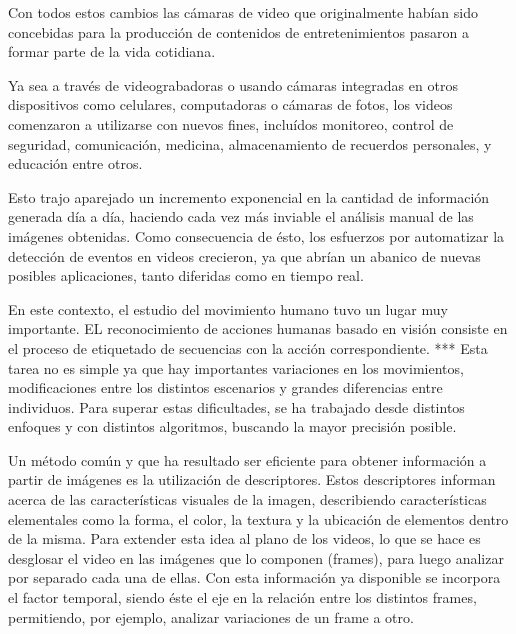 Con todos estos cambios las cámaras de video que originalmente habían sido concebidas para la producción de contenidos de entretenimientos pasaron a
formar parte de la vida cotidiana.

Ya sea a través de videograbadoras o usando cámaras integradas en otros dispositivos como celulares, computadoras o cámaras de fotos, los videos
comenzaron a utilizarse con nuevos fines, incluídos monitoreo, control de seguridad, comunicación, medicina, almacenamiento de recuerdos personales,
y educación entre otros.

Esto trajo aparejado un incremento exponencial en la cantidad de información generada día a día, haciendo cada vez más inviable el análisis manual de
las imágenes obtenidas. Como consecuencia de ésto, los esfuerzos por automatizar la detección de eventos en videos crecieron, ya que abrían un abanico
de nuevas posibles aplicaciones, tanto diferidas como en tiempo real.

En este contexto, el estudio del movimiento humano tuvo un lugar muy importante. EL reconocimiento de acciones humanas basado en visión consiste en el
proceso de etiquetado de secuencias con la acción correspondiente. *** Esta tarea no es simple ya que hay importantes variaciones en los movimientos,
modificaciones entre los distintos escenarios y grandes diferencias entre individuos. Para superar estas dificultades, se ha trabajado desde distintos
enfoques y con distintos algoritmos, buscando la mayor precisión posible.

Un método común y que ha resultado ser eficiente para obtener información a partir de imágenes es la utilización de descriptores.
Estos descriptores informan acerca de las características visuales de la imagen, describiendo características elementales como la forma, el color,
la textura y la ubicación de elementos dentro de la misma.
Para extender esta idea al plano de los videos, lo que se hace es desglosar el video en las imágenes que lo componen (frames), para luego analizar por separado
cada una de ellas. Con esta información ya disponible se incorpora el factor temporal, siendo éste el eje en la relación entre los distintos frames, permitiendo,
por ejemplo, analizar variaciones de un frame a otro.
